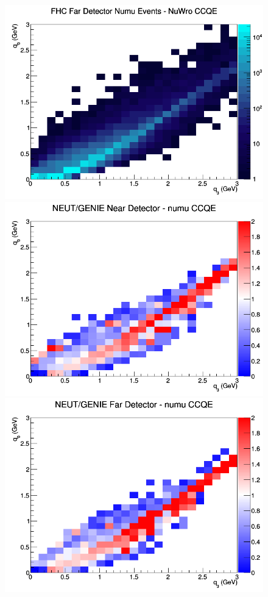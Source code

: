 \begin{figure}[h]
\endminipage
{}
\includegraphics[width=\linewidth]{eff_q0_q3/GAr/CCQE_FHC_FD_numu_q3_q0_NuWro.png}
\endminipage
\newline
{}
\includegraphics[width=\linewidth]{eff_q0_q3/GAr/ratios/CCQE_NEUT_GENIE_numu_near_q3_q0.png}
\endminipage
{}
\includegraphics[width=\linewidth]{eff_q0_q3/GAr/ratios/CCQE_NEUT_GENIE_numu_far_q3_q0.png}

\end{figure}
